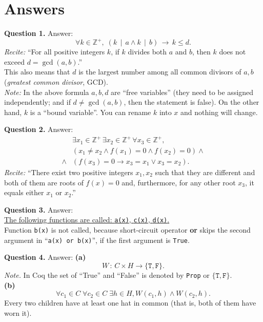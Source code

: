 \documentclass[jou]{apa6}
\begin{document}
\newpage 

\section{Answers}


{\bf Question 1.} Answer:
$$\boxed{\forall k \in \mathbb{Z}^{+},\;\left(k\,\mid\,a \wedge 
k\,\mid\,b\right)\,\rightarrow\,k \leq d.}$$
{\em Recite:} ``For all positive integers $k$, if $k$ divides 
both $a$ and $b$, then $k$ does not exceed 
$d = \operatorname{gcd}(a,b)$.''\\
This also means that $d$ is the largest number among all
common divisors of $a,b$ ({\em greatest common divisor}, GCD).\\
{\em Note:} In the above formula $a,b,d$ are ``free variables''
(they need to be assigned independently; and if 
$d \neq \operatorname{gcd}(a,b)$, then the statement is false). 
On the other hand, $k$ is a ``bound variable''. You can rename
$k$ into $x$ \textendash{} and nothing will change.

\vspace{10pt}
{\bf Question 2.} Answer:
\begin{align}
 & \exists x_1 \in \mathbb{Z}^{+}\,\exists x_2 \in \mathbb{Z}^{+}\,
\forall x_3 \in \mathbb{Z}^{+}, \nonumber \\
 & \left( x_1 \neq x_2 \wedge f(x_1)=0 \wedge f(x_2) = 0 \right) \wedge \nonumber \\
\wedge & \left( f(x_3) = 0 \rightarrow x_3 = x_1 \vee x_3 = x_2 \right). 
\nonumber
\end{align}
{\em Recite:} ``There exist two positive integers $x_1,x_2$ 
such that they are different and 
both of them are roots of $f(x)=0$ and, 
furthermore, for any other root $x_3$, it 
equals either $x_1$ or $x_2$.''

\vspace{10pt}
{\bf Question 3.} Answer:\\
\underline{The following functions are called: {\tt a(x)}, 
{\tt c(x)}, {\tt d(x)}.}\\
Function {\tt b(x)} is not called, because 
short-circuit operator {\bf or} 
skips the second argument in ``{\tt a(x) or b(x)}'', 
if the first argument is {\tt True}.







\vspace{10pt}
{\bf Question 4.} Answer: {\bf (a)}
$$\boxed{W\,:\,C \times H \rightarrow \{ \mathtt{T}, \mathtt{F} \}.}$$
{\em Note.} In Coq the set of ``True'' and ``False'' 
is denoted by {\tt Prop} or $\{ \mathtt{T}, \mathtt{F} \}$.\\
{\bf (b)} 
$$\boxed{\forall c_1 \in C \; \forall c_2 \in C \; \exists h \in H,
W(c_1,h) \wedge W(c_2,h).}$$
Every two
children have at least one hat in common (that is, both
of them have worn it).
\end{document}
